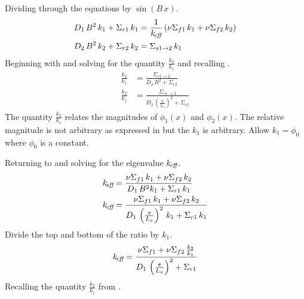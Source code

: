   Dividing through the equations by $\sin(B\,x)$.
  \begin{align}
    \label{eq:1d2g_expression1}
    D_1 \, B^2 \,k_1+ \Sigma_{r1}\,k_1 &= \frac{1}{k_{\!\mbox{\scriptsize \em eff}}} \left( \nu \Sigma_{f1}
      \, k_1 + \nu \Sigma_{f2} \, k_2 \right) \\
    \label{eq:1d2g_expression2}
    D_2 \, B^2 \, k_2 + \Sigma_{r2}\,k_2 &= \Sigma_{s 1\rightarrow 2} \, k_1
  \end{align}
  Beginning with  and solving for the quantity
  $\frac{k_2}{k_1}$ and recalling .
  \begin{align}
    \frac{k_2}{k_1} &= \frac{\Sigma_{s 1\rightarrow 2}}{D_2 \, B^2 + \Sigma_{r2}}
      \\
    \label{eq:1d2g_ratio}
    \frac{k_2}{k_1} &= \frac{\Sigma_{s 1\rightarrow 2}}{D_2 \,
      \left(\frac{\pi}{L_x}\right)^2 + \Sigma_{r2}}
  \end{align}
  The quantity $\frac{k_2}{k_1}$ relates the magnitudes of $\phi_1(x)$ and
  $\phi_2(x)$. The relative magnitude is not arbitrary as expressed in
   but the $k_1$ is arbitrary. Allow $k_1 = \phi_0$ where
  $\phi_0$ is a constant.

  Returning to  and solving for the eigenvalue
  $k_{\!\mbox{\scriptsize \em eff}}$.
  \begin{align}
    k_{\!\mbox{\scriptsize \em eff}} &= \frac{\nu \Sigma_{f1} \, k_1 + \nu \Sigma_{f2} \, k_2}
      {D_1 \, B^2 k_1 + \Sigma_{r1} \, k_1 }\\
    k_{\!\mbox{\scriptsize \em eff}} &= \frac{\nu \Sigma_{f1} \, k_1 + \nu \Sigma_{f2} \, k_2}
      {D_1 \, \left(\frac{\pi}{L_x}\right)^2 \, k_1 + \Sigma_{r1} \, k_1}
  \end{align}
  Divide the top and bottom of the ratio by $k_1$.
  \begin{equation}
    \label{eq:1d2g_keff}
    k_{\!\mbox{\scriptsize \em eff}} = \frac{\nu \Sigma_{f1} + \nu \Sigma_{f2} \, \frac{k_2}{k_1}}
      {D_1 \, \left(\frac{\pi}{L_x}\right)^2 + \Sigma_{r1}}
  \end{equation}
  Recalling the quantity $\frac{k_2}{k_1}$ from .

